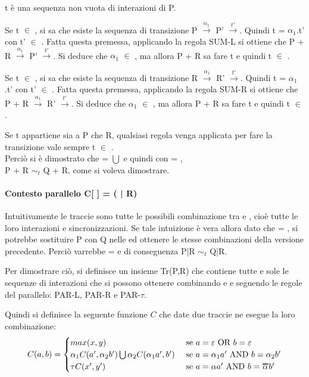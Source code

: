 t è una sequenza non vuota di interazioni di P.

Se t $\in$ , si sa che esiste la sequenza di transizione P $\overset{\alpha_{1}}\rightarrow$ P' $\overset{t'}\rightarrow$. Quindi t = $\alpha_{1}$.t' con t' $\in$ . Fatta questa premessa, applicando la regola SUM-L si ottiene che P + R $\overset{\alpha_{1}}\rightarrow$ P' $\overset{t'}\rightarrow$. Si deduce che $\alpha_{1}$ $\in$ , ma allora P + R sa fare t e quindi t $\in$ .

Se t $\in$ , si sa che esiste la sequenza di transizione R $\overset{\alpha_{1}}\rightarrow$ R' $\overset{t'}\rightarrow$. Quindi t = $\alpha_{1}$.t' con t' $\in$ . Fatta questa premessa, applicando la regola SUM-R si ottiene che P + R $\overset{\alpha_{1}}\rightarrow$ R' $\overset{t'}\rightarrow$. Si deduce che $\alpha_{1}$ $\in$ , ma allora P + R sa fare t e quindi t $\in$ .

Se t appartiene sia a P che R, qualsiasi regola venga applicata per fare la transizione vale sempre t $\in$ .\\

Perciò si è dimostrato che  =  $\bigcup$  e quindi con  = ,\\ P + R $\sim_{t}$ Q + R, come si voleva dimostrare.

\paragraph{Contesto parallelo  C[ ] = (\hspace{0.3cm} | R)} \mbox{}

Intuitivamente le traccie  sono tutte le possibili combinazione tra  e , cioè tutte le loro interazioni e sincronizzazioni. Se tale intuizione è vera allora dato che  = , si potrebbe sostituire P con Q nelle  ed ottenere le stesse combinazioni della versione precedente. Perciò varrebbe  =  e di conseguenza P|R $\sim_{t}$ Q|R.

Per dimostrare ciò, si definisce un insieme Tr(P,R) che contiene tutte e sole le sequenze di interazioni che si possono ottenere combinando  e  e seguendo le regole del parallelo: PAR-L, PAR-R e PAR-$\tau$.

Quindi si definisce la seguente funzione $C$ che date due traccie ne esegue la loro combinazione:
\[
	C(a,b) = 
	\begin{cases}
	max(x,y) &  $ se $ a = \varepsilon $ OR $ b = \varepsilon\\
	\alpha_{1}C(a', \alpha_{2}b')\bigcup\alpha_{2}C(\alpha_{1}a', b') & $ se $ a = \alpha_{1}a' $ AND $ b = \alpha_{2}b'\\
	\tau C(x',y') & $ se $ a = \alpha a' $ AND $ b = \Overline[1pt]{\alpha} b'\\
	\end{cases}
\]

